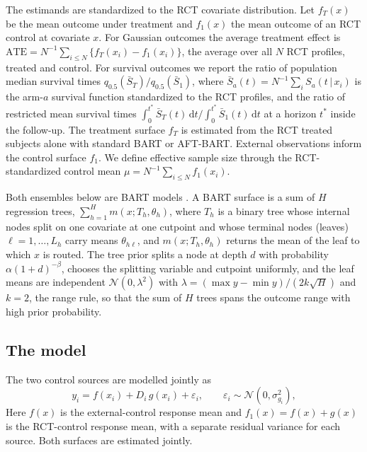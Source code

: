 \documentclass[11pt]{article}
\newcommand{\Normal}{\mathcal{N}}
\newcommand{\given}{\,\vert\,}
\newcommand{\dd}{\mathrm{d}}
\theoremstyle{definition}
\theoremstyle{plain}
\begin{document}
The estimands are standardized to the RCT covariate distribution. Let $f_T(x)$ be the mean outcome under treatment and $f_1(x)$ the mean outcome of an RCT control at covariate $x$. For Gaussian outcomes the average treatment effect is $\mathrm{ATE}=N^{-1}\sum_{i\le N}\{f_T(x_i)-f_1(x_i)\}$, the average over all $N$ RCT profiles, treated and control. For survival outcomes we report the ratio of population median survival times $q_{0.5}(\bar S_T)/q_{0.5}(\bar S_1)$, where $\bar S_a(t)=N^{-1}\sum_i S_a(t\given x_i)$ is the arm-$a$ survival function standardized to the RCT profiles, and the ratio of restricted mean survival times $\int_0^{t^\ast}\bar S_T(t)\,\dd t/\int_0^{t^\ast}\bar S_1(t)\,\dd t$ at a horizon $t^\ast$ inside the follow-up. The treatment surface $f_T$ is estimated from the RCT treated subjects alone with standard BART or AFT-BART. External observations inform the control surface $f_1$. We define effective sample size through the RCT-standardized control mean $\mu=N^{-1}\sum_{i\le N}f_1(x_i)$.

Both ensembles below are BART models \citep{Chipman2010BART}. A BART surface is a sum of $H$ regression trees, $\sum_{h=1}^H m(x;T_h,\theta_h)$, where $T_h$ is a binary tree whose internal nodes split on one covariate at one cutpoint and whose terminal nodes (leaves) $\ell=1,\dots,L_h$ carry means $\theta_{h\ell}$, and $m(x;T_h,\theta_h)$ returns the mean of the leaf to which $x$ is routed. The tree prior splits a node at depth $d$ with probability $\alpha(1+d)^{-\beta}$, chooses the splitting variable and cutpoint uniformly, and the leaf means are independent $\Normal(0,\lambda^2)$ with $\lambda=(\max y-\min y)/(2k\sqrt H)$ and $k=2$, the range rule, so that the sum of $H$ trees spans the outcome range with high prior probability.

\subsection{The model}
\label{sec:model}

The two control sources are modelled jointly as
\begin{equation}
y_i=f(x_i)+D_i\,g(x_i)+\varepsilon_i,\qquad \varepsilon_i\sim\Normal(0,\sigma^2_{g_i}),
\label{eq:model}
\end{equation}
Here $f(x)$ is the external-control response mean and $f_1(x)=f(x)+g(x)$ is the RCT-control response mean, with a separate residual variance for each source. Both surfaces are estimated jointly.
\end{document}

